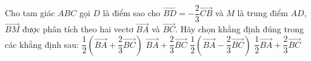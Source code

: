 \documentclass[12pt,a4paper,openany,oneside]{book}
\begin{document}
\begin{ex}%
	Cho tam giác $ABC$ gọi $D$ là điểm sao cho $\overrightarrow{BD}=-\dfrac{2}{3}\overrightarrow{CB}$ và $M$ là trung điểm  $AD$, $\overrightarrow{BM}$ được phân tích theo hai vectơ $\overrightarrow{BA}$ và $\overrightarrow{BC}$. Hãy chọn khẳng định đúng trong các khẳng định sau:
	\choice 
		{\True  $\dfrac{1}{2}\left(\overrightarrow{BA}+\dfrac{2}{3}\overrightarrow{BC}\right)$} 
		 {$\overrightarrow{BA}+\dfrac{2}{3}\overrightarrow{BC}$}
		{$\dfrac{1}{2}\left(\overrightarrow{BA}-\dfrac{2}{3}\overrightarrow{BC}\right)$} 
		{$\dfrac{1}{2}\overrightarrow{BA}+\dfrac{2}{3}\overrightarrow{BC}$}
\end{ex}
\end{document}
